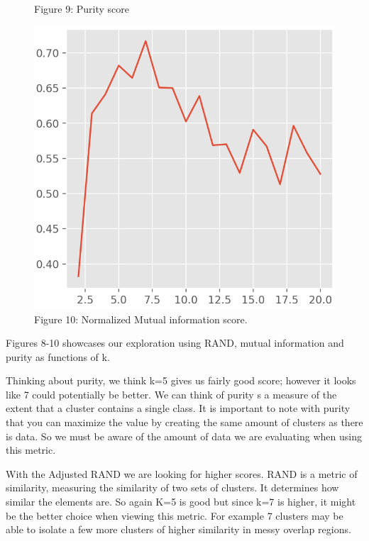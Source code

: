 \documentclass[12pt,article]{article}
\begin{document}
\begin{figure}[H]
\begin{minipage}{.37\textwidth}
  \captionsetup{labelformat=empty}
  \caption{\scriptsize{{Figure 9: Purity score}}}
  \label{fig:test2}
\end{minipage}
\begin{minipage}{.4\textwidth}
  \centering
  \includegraphics[width=1\linewidth]{images/Mutual_info_graph.png}
  \captionsetup{labelformat=empty}
  \caption{\scriptsize{{Figure 10: Normalized Mutual information score.}}}
  \label{fig:test2}
\end{minipage}
\end{figure}


Figures 8-10 showcases our exploration using RAND, mutual information and purity as functions of k. \newline 

Thinking about purity, we think k=5 gives us fairly good score; however it looks like 7 could potentially be better. We can think of purity s a measure of the extent that a cluster contains a single class.  It is important to note with purity that you can maximize the value by creating the same amount of clusters as there is data. So we must be aware of the amount of data we are evaluating when using this metric.\newline

With the Adjusted RAND we are looking for higher scores. RAND is a metric of similarity, measuring the similarity of two sets of clusters. It determines how similar the elements are. So again K=5 is good but since k=7 is higher, it might be the better choice when viewing this metric. For example 7 clusters may be able to isolate a few more clusters of higher similarity in messy overlap regions.\newline 
\end{document}
